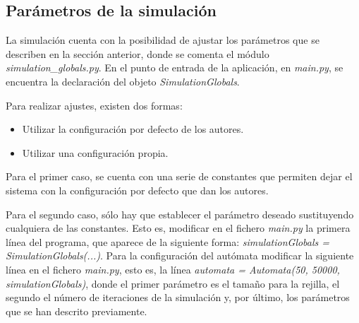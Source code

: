 \subsection{Parámetros de la simulación}

La simulación cuenta con la posibilidad de ajustar los parámetros que se describen en la sección anterior,
donde se comenta el módulo \textit{simulation\_globals.py}. En el punto de entrada de la aplicación,
en \textit{main.py}, se encuentra la declaración del objeto \textit{SimulationGlobals}.

Para realizar ajustes, existen dos formas:

\begin{itemize}
  \item Utilizar la configuración por defecto de los autores.
  \item Utilizar una configuración propia.
\end{itemize}

Para el primer caso, se cuenta con una serie de constantes que permiten dejar el sistema con la
configuración por defecto que dan los autores.

Para el segundo caso, sólo hay que establecer el parámetro deseado sustituyendo cualquiera de las constantes. Esto es,
modificar en el fichero \textit{main.py} la primera línea del programa, que aparece de la siguiente forma:
\textit{simulationGlobals = SimulationGlobals(...)}.
Para la configuración del autómata modificar la siguiente línea en el fichero \textit{main.py}, esto es,
la línea \textit{automata = Automata(50, 50000, simulationGlobals)}, donde el primer parámetro es el tamaño
para la rejilla, el segundo el número de iteraciones de la simulación y, por último, los parámetros que se han
descrito previamente.
